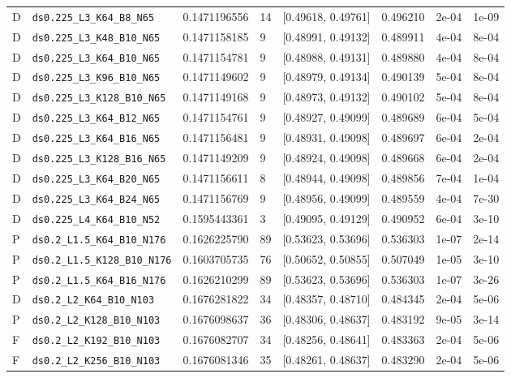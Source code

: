 \begin{longtable}{@{}llrllllr@{}}
D & \texttt{ds0.225\_L3\_K64\_B8\_N65} & 0.1471196556 & 14 & [0.49618, 0.49761] & 0.496210 & 2e-04 & 1e-09\\
D & \texttt{ds0.225\_L3\_K48\_B10\_N65} & 0.1471158185 & 9 & [0.48991, 0.49132] & 0.489911 & 4e-04 & 8e-04\\
D & \texttt{ds0.225\_L3\_K64\_B10\_N65} & 0.1471154781 & 9 & [0.48988, 0.49131] & 0.489880 & 4e-04 & 8e-04\\
D & \texttt{ds0.225\_L3\_K96\_B10\_N65} & 0.1471149602 & 9 & [0.48979, 0.49134] & 0.490139 & 5e-04 & 8e-04\\
D & \texttt{ds0.225\_L3\_K128\_B10\_N65} & 0.1471149168 & 9 & [0.48973, 0.49132] & 0.490102 & 5e-04 & 8e-04\\
D & \texttt{ds0.225\_L3\_K64\_B12\_N65} & 0.1471154761 & 9 & [0.48927, 0.49099] & 0.489689 & 6e-04 & 5e-04\\
D & \texttt{ds0.225\_L3\_K64\_B16\_N65} & 0.1471156481 & 9 & [0.48931, 0.49098] & 0.489697 & 6e-04 & 2e-04\\
D & \texttt{ds0.225\_L3\_K128\_B16\_N65} & 0.1471149209 & 9 & [0.48924, 0.49098] & 0.489668 & 6e-04 & 2e-04\\
D & \texttt{ds0.225\_L3\_K64\_B20\_N65} & 0.1471156611 & 8 & [0.48944, 0.49098] & 0.489856 & 7e-04 & 1e-04\\
D & \texttt{ds0.225\_L3\_K64\_B24\_N65} & 0.1471156769 & 9 & [0.48956, 0.49099] & 0.489559 & 4e-04 & 7e-30\\
D & \texttt{ds0.225\_L4\_K64\_B10\_N52} & 0.1595443361 & 3 & [0.49095, 0.49129] & 0.490952 & 6e-04 & 3e-10\\
P & \texttt{ds0.2\_L1.5\_K64\_B10\_N176} & 0.1626225790 & 89 & [0.53623, 0.53696] & 0.536303 & 1e-07 & 2e-14\\
P & \texttt{ds0.2\_L1.5\_K128\_B10\_N176} & 0.1603705735 & 76 & [0.50652, 0.50855] & 0.507049 & 1e-05 & 3e-10\\
P & \texttt{ds0.2\_L1.5\_K64\_B16\_N176} & 0.1626210299 & 89 & [0.53623, 0.53696] & 0.536303 & 1e-07 & 3e-26\\
D & \texttt{ds0.2\_L2\_K64\_B10\_N103} & 0.1676281822 & 34 & [0.48357, 0.48710] & 0.484345 & 2e-04 & 5e-06\\
P & \texttt{ds0.2\_L2\_K128\_B10\_N103} & 0.1676098637 & 36 & [0.48306, 0.48637] & 0.483192 & 9e-05 & 3e-14\\
F & \texttt{ds0.2\_L2\_K192\_B10\_N103} & 0.1676082707 & 34 & [0.48256, 0.48641] & 0.483363 & 2e-04 & 5e-06\\
F & \texttt{ds0.2\_L2\_K256\_B10\_N103} & 0.1676081346 & 35 & [0.48261, 0.48637] & 0.483290 & 2e-04 & 5e-06\\

\end{longtable}

